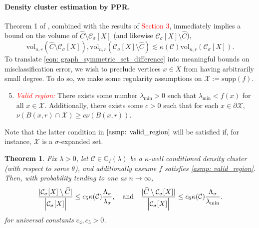 \documentclass{article}
\DeclarePairedDelimiter\abs{\lvert}{\rvert}
\newcommand{\vol}{\mathrm{vol}}
\newcommand{\1}{\mathbf{1}}
\newcommand{\Xbf}{X}             %
\newcommand{\Cbb}{\mathbb{C}}
\newcommand{\Cset}{\mathcal{C}}
\newcommand{\Csig}{\Cset_{\sigma}}
\newcommand{\Cest}{\widehat{C}}
\newcommand{\ppr}{{\sc PPR}}
\theoremstyle{aldenthm}
\newtheorem{theorem}{Theorem}
\theoremstyle{aldenrmrk}
\begin{document}
\paragraph{Density cluster estimation by \ppr.}

Theorem 1 of \cite{zhu2013}, combined with the results of \textcolor{red}{Section 3}, immediately implies a bound on the volume of $\Cest \setminus \Csig[\Xbf]$ (and likewise $\Csig[\Xbf] \setminus \Cest$),
\begin{equation}
\label{eqn: graph_symmetric_set_difference}
\vol_{n,r}(\Cest \setminus \Csig[\Xbf]), \vol_{n,r}(\Csig[\Xbf] \setminus \Cest) \lesssim \kappa(\Cset) \vol_{n,r}(\Csig[\Xbf]).
\end{equation}
To translate \eqref{eqn: graph_symmetric_set_difference} into meaningful bounds on misclassification error, we wish to preclude vertices $x \in \Xbf$ from having arbitrarily small degree. To do so, we make some regularity assumptions on $\mathcal{X} := \mathrm{supp}(f)$.
\begin{enumerate}[label=(A\arabic*)]
	\setcounter{enumi}{4}
	\item 
	\label{asmp: valid_region}
	\emph{\textcolor{red}{Valid region:}} There exists some number $\lambda_{\min} > 0$ such that $\lambda_{\min} < f(x)$ for all $x \in \mathcal{X}$. Additionally, there exists some $c > 0$ such that for each $x \in \partial \mathcal{X}$, $\nu(B(x,r) \cap \mathcal{X}) \geq c\nu(B(x,r))$.
\end{enumerate}
Note that the latter condition in $\ref{asmp: valid_region}$ will be satisfied if, for instance, $\mathcal{X}$ is a $\sigma$-expanded set.

\begin{theorem}
	\label{thm: misclassification_rate}
	Fix $\lambda > 0$, let $\Cset \in \Cbb_f(\lambda)$ be a $\kappa$-well conditioned density cluster (with respect to some $\theta$), and additionally assume $f$ satisfies \ref{asmp: valid_region}. Then, with probability tending to one as $n \to \infty$,
	\begin{equation}
	\label{eqn: misclassification_rate_ub}
	\frac{\abs{\Csig[\Xbf] \setminus \Cest}}{\Bigl|\Csig[\Xbf]\Bigr|} \leq c_5 \kappa(\Cset) \frac{\Lambda_{\sigma}}{\lambda_{\sigma}}, \quad \textrm{and} \quad \frac{\abs{\Cest \setminus \Csig[\Xbf]}}{\Bigl|\Csig[\Xbf]\Bigr|} \leq c_6 \kappa(\Cset) \frac{\Lambda_{\sigma}}{\lambda_{\min}}.
	\end{equation}
	for universal constants $c_4, c_5 > 0$. 
\end{theorem}
\end{document}
